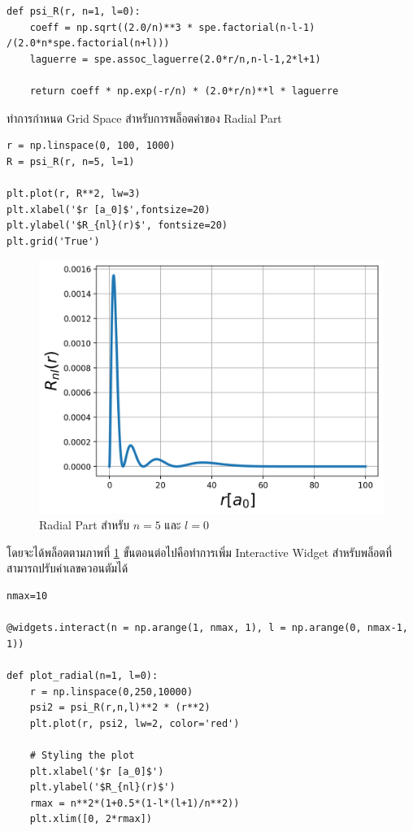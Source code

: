 \begin{lstlisting}[style=MyPython]
def psi_R(r, n=1, l=0):
    coeff = np.sqrt((2.0/n)**3 * spe.factorial(n-l-1) /(2.0*n*spe.factorial(n+l)))
    laguerre = spe.assoc_laguerre(2.0*r/n,n-l-1,2*l+1)
    
    return coeff * np.exp(-r/n) * (2.0*r/n)**l * laguerre
\end{lstlisting}

\noindent ทำการกำหนด Grid Space สำหรับการพล็อตค่าของ Radial Part

\begin{lstlisting}[style=MyPython]
r = np.linspace(0, 100, 1000)
R = psi_R(r, n=5, l=1)

plt.plot(r, R**2, lw=3)
plt.xlabel('$r [a_0]$',fontsize=20)
plt.ylabel('$R_{nl}(r)$', fontsize=20)
plt.grid('True')
\end{lstlisting}

\begin{figure}[H]
    \centering
    \includegraphics[width=0.8\linewidth]{fig/wfn_hydro_radial.png}
    \caption{Radial Part สำหรับ $n = 5$ และ $l = 0$}
    \label{fig:wfn_hydro_radial}
\end{figure}

\noindent โดยจะได้พล็อตตามภาพที่ \ref{fig:wfn_hydro_radial} ขั้นตอนต่อไปคือทำการเพิ่ม Interactive Widget สำหรับพล็อตที่%
สามารถปรับค่าเลขควอนตัมได้

\begin{lstlisting}[style=MyPython]
nmax=10

@widgets.interact(n = np.arange(1, nmax, 1), l = np.arange(0, nmax-1, 1))

def plot_radial(n=1, l=0):
    r = np.linspace(0,250,10000)
    psi2 = psi_R(r,n,l)**2 * (r**2)
    plt.plot(r, psi2, lw=2, color='red')

    # Styling the plot
    plt.xlabel('$r [a_0]$')
    plt.ylabel('$R_{nl}(r)$')
    rmax = n**2*(1+0.5*(1-l*(l+1)/n**2))
    plt.xlim([0, 2*rmax])
\end{lstlisting}

